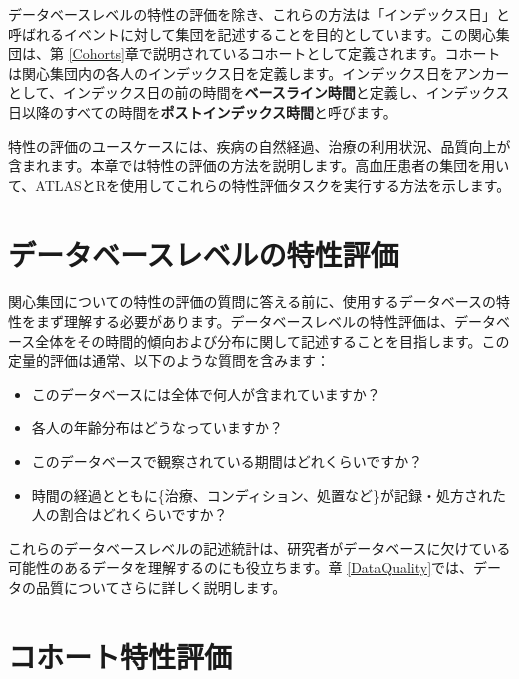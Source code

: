 \documentclass[
  11pt]{book}
\providecommand{\tightlist}{%
  \setlength{\itemsep}{0pt}\setlength{\parskip}{0pt}}
\theoremstyle{definition}
\theoremstyle{definition}
\theoremstyle{definition}
\theoremstyle{definition}
\theoremstyle{remark}
\begin{document}
データベースレベルの特性の評価を除き、これらの方法は「インデックス日」と呼ばれるイベントに対して集団を記述することを目的としています。この関心集団は、第 \ref{Cohorts}章で説明されているコホートとして定義されます。コホートは関心集団内の各人のインデックス日を定義します。インデックス日をアンカーとして、インデックス日の前の時間を\textbf{ベースライン時間}と定義し、インデックス日以降のすべての時間を\textbf{ポストインデックス時間}と呼びます。

特性の評価のユースケースには、疾病の自然経過、治療の利用状況、品質向上が含まれます。本章では特性の評価の方法を説明します。高血圧患者の集団を用いて、ATLASとRを使用してこれらの特性評価タスクを実行する方法を示します。       

\section{データベースレベルの特性評価}\label{ux30c7ux30fcux30bfux30d9ux30fcux30b9ux30ecux30d9ux30ebux306eux7279ux6027ux8a55ux4fa1}

関心集団についての特性の評価の質問に答える前に、使用するデータベースの特性をまず理解する必要があります。データベースレベルの特性評価は、データベース全体をその時間的傾向および分布に関して記述することを目指します。この定量的評価は通常、以下のような質問を含みます：

\begin{itemize}
\tightlist
\item
  このデータベースには全体で何人が含まれていますか？
\item
  各人の年齢分布はどうなっていますか？
\item
  このデータベースで観察されている期間はどれくらいですか？
\item
  時間の経過とともに\{治療、コンディション、処置など\}が記録・処方された人の割合はどれくらいですか？
\end{itemize}

これらのデータベースレベルの記述統計は、研究者がデータベースに欠けている可能性のあるデータを理解するのにも役立ちます。章 \ref{DataQuality}では、データの品質についてさらに詳しく説明します。 

\section{コホート特性評価}\label{ux30b3ux30dbux30fcux30c8ux7279ux6027ux8a55ux4fa1}
\end{document}
